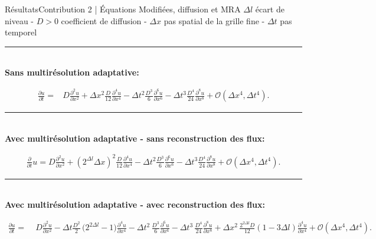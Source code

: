 
\begin{frame}{Résultats}{Contribution 2 | Équations Modifiées, diffusion et MRA}
    \centering\scriptsize$\Delta l$ écart de niveau - $D>0$ coefficient de diffusion - $\Delta x$ pas spatial de la grille fine - $\Delta t$ pas temporel\\\normalsize
    \noindent\color{Primary}\rule{\linewidth}{0.6pt}\color{black}\\
    \textbf{Sans multirésolution adaptative: }\\
    \begin{center}\footnotesize
    \begin{align}
            \frac{\partial u}{\partial t}  =&D \frac{\partial^{2}u}{\partial x^{2}}
            + \Delta x^{2} \frac{D}{12}             \frac{\partial^{4}u}{\partial x^{4}} 
            -  \Delta t^{2} \frac{D^{3}}{6}          \frac{\partial^{6}u}{\partial x^{6}} 
            -  \Delta t^{3} \frac{D^{4}}{24}        \frac{\partial^{8}u}{\partial x^{8}}  + \mathcal{O}(\Delta x^4 , \Delta t^4).
    \end{align}
    \end{center}\pause
    \noindent\color{Primary}\rule{\linewidth}{0.6pt}\color{black}\\
    \textbf{Avec multirésolution adaptative - sans reconstruction des flux: }\\
        \begin{center}\footnotesize
        \begin{align}\label{eq:sansRecons:brute}
            \frac{\partial}{\partial t} u=
                D \frac{\partial^{2}u}{\partial x^{2}}
                + (2^{\Delta l} \Delta x)^{2}  \frac{D}{12} \frac{\partial^{4}u}{\partial x^{4}}
                -\Delta t^{2} \frac{D^{3}}{6}   \frac{\partial^{6}u}{\partial x^{6}}
                -\Delta t^{3} \frac{D^{4} }{24} \frac{\partial^{8}u}{\partial x^{8}}
                + \mathcal{O}(\Delta x^4 , \Delta t^4).
        \end{align}
        \end{center}\pause
    \noindent\color{Primary}\rule{\linewidth}{0.6pt}\color{black}\\
    \textbf{Avec multirésolution adaptative - avec reconstruction des flux: }\\
        \begin{center}\scriptsize
        \begin{align}\label{eq:equiv_brute_recons}
            \frac{\partial u}{\partial t} =&\; D \frac{\partial^2 u}{\partial x^2} 
            - \Delta t \frac{D^2}{2} \, \bigl( 2^{2\Delta l}- 1 \bigr)          \frac{\partial^4 u}{\partial x^4}
            - \Delta t^2\, \frac{D^3}{6}          \frac{\partial^6 u}{\partial x^6}
            - \Delta t^3\, \frac{D^4}{24}         \frac{\partial^8 u}{\partial x^8} 
            + \Delta x^2\, \frac{2^{2\Delta l}D}{12}  (1 - 3 \Delta l)  \frac{\partial^4 u}{\partial x^4}
            + \mathcal{O}(\Delta x^4 , \Delta t^4).
        \end{align}
    \end{center}

\end{frame}